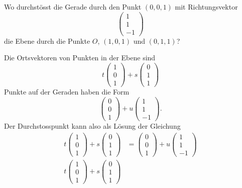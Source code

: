 Wo durchstösst die Gerade durch den Punkt $(0,0,1)$ mit Richtungsvektor
\[
\begin{pmatrix}1\\1\\-1\end{pmatrix}
\]
die Ebene durch die Punkte $O$, $(1,0,1)$ und $(0,1,1)$?

\begin{loesung}
Die Ortsvektoren von Punkten in der Ebene sind
\[
t
\begin{pmatrix}1\\0\\1\end{pmatrix}
+
s
\begin{pmatrix}0\\1\\1\end{pmatrix}
\]
Punkte auf der Geraden haben die Form
\[
\begin{pmatrix}0\\0\\1\end{pmatrix}+u\begin{pmatrix}1\\1\\-1\end{pmatrix}.
\]
Der Durchstosspunkt kann also als Lösung der Gleichung
\begin{align*}
t\begin{pmatrix}1\\0\\1\end{pmatrix}
+
s\begin{pmatrix}0\\1\\1\end{pmatrix}
&=
\begin{pmatrix}0\\0\\1\end{pmatrix}+u\begin{pmatrix}1\\1\\-1\end{pmatrix}
\\
t\begin{pmatrix}1\\0\\1\end{pmatrix}
+
s\begin{pmatrix}0\\1\\1\end{pmatrix}

\end{align*}
\end{loesung}
